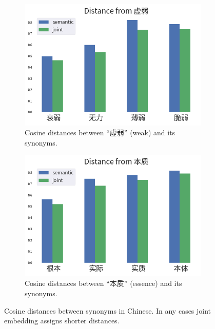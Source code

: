 \begin{figure}[h!]
\begin{CJK}{UTF8}{gbsn}
    \begin{subfigure}[b]{0.44\textwidth}
        \centering
        \includegraphics[width=\textwidth]{../images/similarity_zh3.png}
        \caption{Cosine distances between ``虛弱'' (weak) and its synonyms.}
        \label{fig:similarity_zh3}
    \end{subfigure}
    \hspace{2em}
    \begin{subfigure}[b]{0.44\textwidth}
        \centering
        \includegraphics[width=\textwidth]{../images/similarity_zh4.png}
        \caption{Cosine distances between ``本质'' (essence) and its synonyms.}
        \label{fig:similarity_zh4}
    \end{subfigure}
    \caption[Cosine distances between synonyms in Chinese]{Cosine distances between synonyms in Chinese. In any cases joint embedding assigns shorter distances.}
	\label{fig:similarity_zh}
\end{CJK}
\end{figure}

